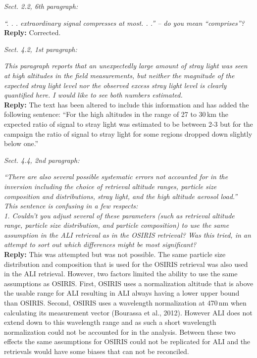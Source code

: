 \documentclass[12pt, notitlepage]{article}
\begin{document}
\textit{Sect. 2.2, 6th paragraph:}

\textit{``. . . extraordinary signal compresses at most. . .'' – do you mean ``comprises''?}\\

\textbf{Reply:} Corrected.

\hrulefill

\textit{Sect. 4.2, 1st paragraph:}

\textit{This paragraph reports that an unexpectedly large amount of stray light was seen at
high altitudes in the field measurements, but neither the magnitude of the expected
stray light level nor the observed excess stray light level is clearly quantified here. I
would like to see both numbers estimated.}\\

\textbf{Reply:} The text has been altered to include this information and has added the following sentence: ``For the high altitudes in the range of 27 to 30\,km the expected ratio of signal to stray light was estimated to be between 2-3 but for the campaign the ratio of signal to stray light for some regions dropped down slightly below one.''

\hrulefill

\textit{Sect. 4.4, 2nd paragraph:}

\textit{``There are also several possible systematic errors not accounted for in the inversion
including the choice of retrieval altitude ranges, particle size composition and distributions,
stray light, and the high altitude aerosol load.''}\\

\textit{This sentence is confusing in a few respects:}\\

\textit{1. Couldn't you adjust several of these parameters (such as retrieval altitude range,
particle size distribution, and particle composition) to use the same assumption in the
ALI retrieval as in the OSIRIS retrieval? Was this tried, in an attempt to sort out which
differences might be most significant?}\\

\textbf{Reply:} This was attempted but was not possible. The same particle size distribution and composition
that is used for the OSIRIS retrieval was also used in the ALI retrieval.  However, two factors limited the ability to use the same assumptions as OSIRIS. First, OSIRIS uses a normalization altitude that is above the usable range for ALI resulting in ALI always having a lower upper bound than OSIRIS. Second, OSIRIS uses a wavelength normalization at 470\,nm when calculating its measurement vector (Bourassa et al., 2012). However ALI does not extend down to this wavelength range and as such a short wavelength normalization could not be accounted for in the analysis. Between these two effects the same assumptions for OSIRIS could not be replicated for ALI and the retrievals would have some biases that can not be reconciled.\\
\end{document}
